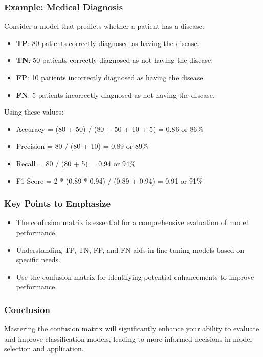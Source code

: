 \documentclass[aspectratio=169]{beamer}
\begin{document}
\begin{frame}[fragile]
    \frametitle{Example: Medical Diagnosis}
    Consider a model that predicts whether a patient has a disease:
    
    \begin{itemize}
        \item \textbf{TP}: 80 patients correctly diagnosed as having the disease.
        \item \textbf{TN}: 50 patients correctly diagnosed as not having the disease.
        \item \textbf{FP}: 10 patients incorrectly diagnosed as having the disease.
        \item \textbf{FN}: 5 patients incorrectly diagnosed as not having the disease.
    \end{itemize}
    
    Using these values:
    \begin{itemize}
        \item Accuracy = (80 + 50) / (80 + 50 + 10 + 5) = 0.86 or 86\%
        \item Precision = 80 / (80 + 10) = 0.89 or 89\%
        \item Recall = 80 / (80 + 5) = 0.94 or 94\%
        \item F1-Score = 2 * (0.89 * 0.94) / (0.89 + 0.94) = 0.91 or 91\%
    \end{itemize}
\end{frame}

\begin{frame}[fragile]
    \frametitle{Key Points to Emphasize}
    \begin{itemize}
        \item The confusion matrix is essential for a comprehensive evaluation of model performance.
        \item Understanding TP, TN, FP, and FN aids in fine-tuning models based on specific needs.
        \item Use the confusion matrix for identifying potential enhancements to improve performance.
    \end{itemize}
\end{frame}

\begin{frame}[fragile]
    \frametitle{Conclusion}
    Mastering the confusion matrix will significantly enhance your ability to evaluate and improve classification models, leading to more informed decisions in model selection and application.
\end{frame}
\end{document}
